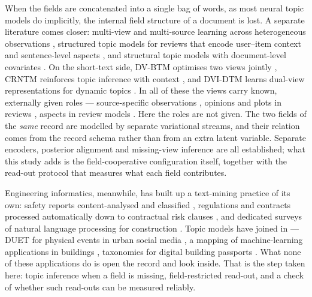 \documentclass[pdflatex,sn-basic]{sn-jnl}
\begin{document}
When the fields are concatenated into a single bag of words, as most neural topic models do
implicitly, the internal field structure of a document is lost. A separate literature comes closer: multi-view
and multi-source learning across heterogeneous observations
\cite{kurle2019multisource,zhang2017robust,pergola2021disentangled,liu2022dualview}, structured
topic models for reviews that encode user--item context and sentence-level aspects
\cite{esmaeili2019structured}, and structural topic models with document-level covariates
\cite{roberts2019stm}. On the short-text side, DV-BTM optimises two views jointly
\cite{liu2022dualview}, CRNTM reinforces topic inference with context \cite{crntm2020}, and
DVI-DTM learns dual-view representations for dynamic topics \cite{dvidtm2026}. In all of these
the views carry known, externally given roles --- source-specific observations
\cite{kurle2019multisource}, opinions and plots in reviews \cite{pergola2021disentangled},
aspects in review models \cite{esmaeili2019structured}. Here the roles are not given. The two
fields of the \emph{same} record are modelled by separate variational streams, and their relation
comes from the record schema rather than from an extra latent variable. Separate encoders,
posterior alignment and missing-view inference are all established; what this study adds is the
field-cooperative configuration itself, together with the read-out protocol that measures what
each field contributes.

Engineering informatics, meanwhile, has built up a text-mining practice of its own: safety
reports content-analysed and classified \cite{civilsafety2015,civilaccident2018}, regulations and
contracts processed automatically down to contractual risk clauses
\cite{compliance2013,ontology2015,contract2022,risknlp2023}, and dedicated surveys of natural
language processing for construction \cite{civilnlp2021,civilnlp2023}. Topic models have joined
in --- DUET for physical events in urban social media \cite{duet2019}, a mapping of
machine-learning applications in buildings \cite{civiltopic2024}, taxonomies for digital building
passports \cite{passport2026}. What none of these applications do is open the record and look
inside. That is the step taken here: topic inference when a field is missing, field-restricted
read-out, and a check of whether such read-outs can be measured reliably.
\end{document}
